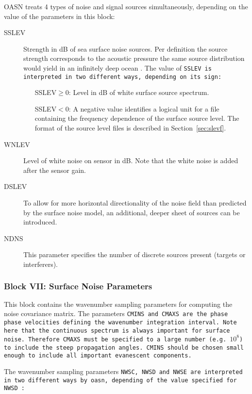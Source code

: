 OASN treats 4 types of noise and signal sources simultaneously,
depending on the value of the parameters in this block:

\begin{description}
\item[SSLEV] Strength in dB of sea surface noise sources. Per
definition the source strength corresponds to the acoustic pressure
the same source distribution would yield in an infinitely deep ocean
\cite{jkps,sk:jasa88}.
The value of \tt SSLEV \rm is interpreted in two different ways,
depending on its sign:
\begin{itemize}
\item[SSLEV$\ge0$:] Level in dB of white surface source spectrum.
\item[SSLEV$<0$:] A negative value identifies a logical unit for a file
containing the frequency dependence of the surface source level. The format of
the source level files is described in Section~\ref{sec:slevf}.
\end{itemize}
\item[WNLEV] Level of white noise on sensor in dB. Note that the white
noise is added after the sensor gain.
\item[DSLEV] To allow for more horizontal directionality of the noise
field than predicted by the surface noise model, an additional, deeper
sheet of sources can be introduced.
\item[NDNS] This parameter specifies the number of discrete sources present
(targets or interferers).
\end{description}

\subsubsection{Block VII: Surface Noise Parameters}

This block contains the wavenumber sampling parameters for computing the
noise covariance matrix. The parameters \tt CMINS \rm and \tt CMAXS
\rm are the phase phase velocities defining the wavenumber integration
interval. Note here that the continuous spectrum is always important
for surface noise. Therefore \tt CMAXS \rm must be specified to a
large number (e.g. $10^8$) to include the steep propagation angles.
\tt CMINS \rm should be chosen small enough to include all important
evanescent components. 

The wavenumber sampling parameters \tt NWSC, NWSD \rm and \tt NWSE \rm are
interpreted in two different ways by \tt oasn\rm, depending of the
value specified for \tt NWSD \rm:

